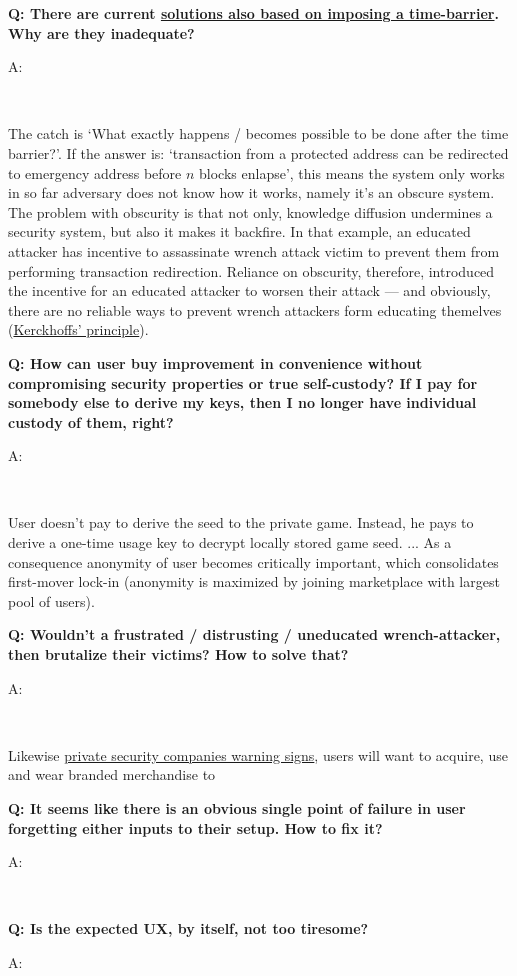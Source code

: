 \documentclass[12pt,a4paper]{article}
\newenvironment{question}[1]{%
  \vspace{0.8em}\noindent\textbf{Q: #1}\par
  \vspace{0.2em}\noindent\begin{itshape}A:\end{itshape}~%
}{\vspace{0.8em}}
\begin{document}
\begin{question}{There are current \href{https://rewindbitcoin.com/}{solutions also based on imposing a time-barrier}. Why are they inadequate?}
The catch is `What exactly happens / becomes possible to be done after the time barrier?'. If the answer is: `transaction from a protected address can be redirected to emergency address before $n$ blocks enlapse', this means the system only works in so far adversary does not know how it works, namely it's an obscure system. The problem with obscurity is that not only, knowledge diffusion undermines a security system, but also it makes it backfire. In that example, an educated attacker has incentive to assassinate wrench attack victim to prevent them from performing transaction redirection. Reliance on obscurity, therefore, introduced the incentive for an educated attacker to worsen their attack --- and obviously, there are no reliable ways to prevent wrench attackers form educating themelves (\href{kprinciple}{Kerckhoffs' principle}).
\end{question}

\begin{question}{How can user buy improvement in convenience without compromising security properties or true self-custody? If I pay for somebody else to derive my keys, then I no longer have individual custody of them, right?}
User doesn't pay to derive the seed to the private game. Instead, he pays to derive a one-time usage key to decrypt locally stored game seed.
...
As a consequence anonymity of user becomes critically important, which consolidates first-mover lock-in (anonymity is maximized by joining marketplace with largest pool of users).
\end{question}

\begin{question}{Wouldn't a frustrated / distrusting / uneducated wrench-attacker, then brutalize their victims? How to solve that?}
Likewise \href{}{private security companies warning signs}, users will want to acquire, use and wear branded merchandise to 
\end{question}

\begin{question}{It seems like there is an obvious single point of failure in user forgetting either inputs to their setup. How to fix it?}
\end{question}

\begin{question}{Is the expected UX, by itself, not too tiresome?}
\end{question}
\end{document}

